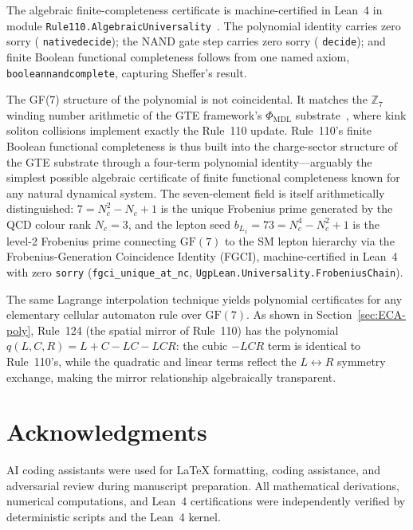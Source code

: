 \documentclass[11pt]{article}
\theoremstyle{remark}
\newcommand{\lean}[1]{%
  \penalty-100
  \begingroup\def\_{\textunderscore\allowbreak}\texttt{#1}\endgroup}
\begin{document}
\begin{sloppypar}
The algebraic finite-completeness certificate is machine-certified in Lean~4 in
module \lean{Rule110.\allowbreak{}AlgebraicUniversality}~\cite{rule110-lean}.
The polynomial identity carries zero sorry (\lean{native\_decide});
the NAND gate step carries zero sorry (\lean{decide}); and finite Boolean
functional completeness follows from one named axiom, \lean{boolean\_nand\_complete},
capturing Sheffer's result.
\end{sloppypar}

The GF(7) structure of the polynomial is not coincidental.
It matches the $\mathbb{Z}_7$ winding number arithmetic of the GTE framework's
$\Phi_{\mathrm{MDL}}$ substrate~\cite{SpivackCompUniversality,SpivackGTEMobius},
where kink soliton collisions implement exactly the Rule~110 update.
Rule~110's finite Boolean functional completeness is thus built into the
charge-sector structure of the GTE substrate through a four-term polynomial
identity---arguably the simplest possible algebraic certificate of finite
functional completeness known for any natural dynamical system.
The seven-element field is itself arithmetically distinguished: $7 = N_c^2 - N_c + 1$ is the unique Frobenius prime generated by the QCD colour rank $N_c = 3$, and the lepton seed $b_{L_1} = 73 = N_c^4 - N_c^2 + 1$ is the level-2 Frobenius prime connecting $\mathrm{GF}(7)$ to the SM lepton hierarchy via the Frobenius-Generation Coincidence Identity (FGCI), machine-certified in Lean~4 with zero \texttt{sorry} (\texttt{fgci\_unique\_at\_nc}, \texttt{UgpLean.Universality.FrobeniusChain}).

The same Lagrange interpolation technique yields polynomial certificates for any
elementary cellular automaton rule over $\mathrm{GF}(7)$.
As shown in Section~\ref{sec:ECA-poly}, Rule~124 (the spatial mirror of Rule~110)
has the polynomial $q(L,C,R) = L + C - LC - LCR$: the cubic $-LCR$ term is
identical to Rule~110's, while the quadratic and linear terms reflect the
$L \leftrightarrow R$ symmetry exchange, making the mirror relationship
algebraically transparent.

\section*{Acknowledgments}

AI coding assistants were used for LaTeX formatting, coding assistance, and adversarial review during manuscript preparation. All mathematical derivations, numerical computations, and Lean~4 certifications were independently verified by deterministic scripts and the Lean~4 kernel.
\end{document}
